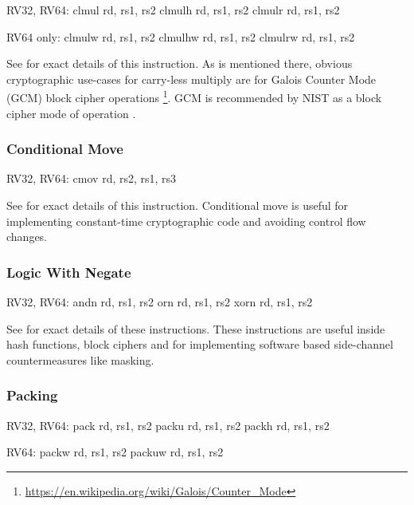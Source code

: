 \begin{isa}
RV32, RV64:
    clmul rd, rs1, rs2
    clmulh rd, rs1, rs2
    clmulr rd, rs1, rs2

RV64 only:
    clmulw rd, rs1, rs2
    clmulhw rd, rs1, rs2
    clmulrw rd, rs1, rs2
\end{isa}

See \cite[Section 2.6]{riscv:bitmanip:draft} for exact details of
this instruction.
As is mentioned there, obvious cryptographic use-cases for carry-less
multiply are for Galois Counter Mode (GCM) block cipher operations
\footnote{\url{https://en.wikipedia.org/wiki/Galois/Counter_Mode}}.
GCM is recommended by NIST as a block cipher mode of operation
\cite{nist:gcm}.

\subsubsection{Conditional Move}

\begin{isa}
RV32, RV64:
    cmov rd, rs2, rs1, rs3
\end{isa}

See \cite[Section 2.9.2]{riscv:bitmanip:draft} for exact details of
this instruction.
Conditional move is useful for implementing constant-time cryptographic
code and avoiding control flow changes.

\subsubsection{Logic With Negate}

\begin{isa}
RV32, RV64:
    andn rd, rs1, rs2
     orn rd, rs1, rs2
    xorn rd, rs1, rs2
\end{isa}

See \cite[Section 2.1.3]{riscv:bitmanip:draft} for exact details of
these instructions.
These instructions are useful inside hash functions, block ciphers and
for implementing software based side-channel countermeasures like masking.


\subsubsection{Packing}

\begin{isa}
RV32, RV64: 
    pack   rd, rs1, rs2
    packu  rd, rs1, rs2
    packh  rd, rs1, rs2

RV64: 
    packw  rd, rs1, rs2
    packuw rd, rs1, rs2
\end{isa}

